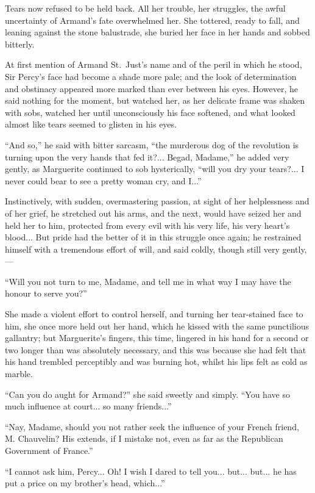 \documentclass[paper=5.5in:8.5in,BCOR=7mm,twoside,DIV=calc,12pt,usegeometry,chapterprefix,endperiod,headings=big]{scrbook}
\begin{document}
Tears now refused to be held back. All her trouble, her struggles, the awful uncertainty of Armand's fate overwhelmed her. She tottered, ready to fall, and leaning against the stone balustrade, she buried her face in her hands and sobbed bitterly.

At first mention of Armand St.~Just's name and of the peril in which he stood, Sir Percy's face had become a shade more pale; and the look of determination and obstinacy appeared more marked than ever between his eyes. However, he said nothing for the moment, but watched her, as her delicate frame was shaken with sobs, watched her until unconsciously his face softened, and what looked almost like tears seemed to glisten in his eyes.

\enquote{And so,} he said with bitter sarcasm, \enquote{the murderous dog of the revolution is turning upon the very hands that fed it?... Begad, Madame,} he added very gently, as Marguerite continued to sob hysterically, \enquote{will you dry your tears?... I never could bear to see a pretty woman cry, and I...}

Instinctively, with sudden, overmastering passion, at sight of her helplessness and of her grief, he stretched out his arms, and the next, would have seized her and held her to him, protected from every evil with his very life, his very heart's blood... But pride had the better of it in this struggle once again; he restrained himself with a tremendous effort of will, and said coldly, though still very gently,---

\enquote{Will you not turn to me, Madame, and tell me in what way I may have the honour to serve you?}

She made a violent effort to control herself, and turning her tear-stained face to him, she once more held out her hand, which he kissed with the same punctilious gallantry; but Marguerite's fingers, this time, lingered in his hand for a second or two longer than was absolutely necessary, and this was because she had felt that his hand trembled perceptibly and was burning hot, whilst his lips felt as cold as marble.

\enquote{Can you do aught for Armand?} she said sweetly and simply. \enquote{You have so much influence at court... so many friends...}

\enquote{Nay, Madame, should you not rather seek the influence of your French friend, M. Chauvelin? His extends, if I mistake not, even as far as the Republican Government of France.}

\enquote{I cannot ask him, Percy... Oh! I wish I dared to tell you... but... but... he has put a price on my brother's head, which...}
\end{document}
